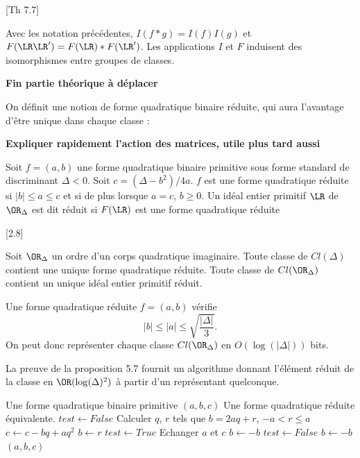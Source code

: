 \begin{Prop}\cite{Cox}[Th 7.7]
	
	Avec les notation précédentes, $I(f*g) = I(f)I(g)$ et $F(\LR\LR') = F(\LR)*F(\LR')$. Les applications $I$ et $F$ induisent des isomorphismes entre groupes de classes.
\end{Prop}




\textbf{Fin partie théorique à déplacer}




On définit une notion de forme quadratique binaire réduite, qui aura l'avantage d'être unique dans chaque classe :

\textbf{Expliquer rapidement l'action des matrices, utile plus tard aussi}

\begin{Def}
	Soit $f = (a,b)$ une forme quadratique binaire primitive sous forme standard de discriminant $\Delta < 0$. Soit $c = (\Delta - b^2)/4a$. $f$ est une forme quadratique réduite si $|b| \leq a \leq c$ et si de plus lorsque $a = c$, $b \geq 0$. Un idéal entier primitif $\LR$ de $\OR_{\Delta}$ est dit réduit si $F(\LR)$ est une forme quadratique réduite
\end{Def}

\begin{Prop}\cite{Cox}[2.8]
	
	Soit $\OR_{\Delta}$ un ordre d'un corps quadratique imaginaire. Toute classe de $Cl(\Delta)$ contient une unique forme quadratique réduite. Toute classe de $Cl(\OR_{\Delta})$ contient un unique idéal entier primitif réduit. 
\end{Prop}

\begin{Rem}
	Une forme quadratique réduite $f = (a,b)$ vérifie 
	\begin{equation*}
		|b|\leq|a|\leq\sqrt{\frac{|\Delta|}{3}}.
	\end{equation*}
	On peut donc représenter chaque classe $Cl(\OR_{\Delta})$ en $O(\log(|\Delta|))$ bits. 
\end{Rem}

La preuve de la proposition 5.7 fournit un algorithme donnant l'élément réduit de la classe en $\OR(\log(\Delta)^{2} )$ à partir d'un représentant quelconque.

\begin{algorithm}
	\caption{Réduction de forme quadratique binaire primitive}
	\begin{algorithmic}[1]
		\Require Une forme quadratique binaire primitive $(a,b,c)$
		\Ensure Une forme quadratique réduite équivalente.
		\State $test \gets False$
		\State Calculer $q$, $r$ tels que $b = 2aq + r$, $-a<r\leq a$
		\State $c \gets c - bq + aq^2$
		\State $b \gets r$
		\EndIf
		\State $test \gets True$
		\State Echanger $a$ et $c$
		\State $b \gets -b$
		\State $test \gets False$
		\EndIf
		\State $b \gets -b$
		\EndIf
		\EndIf
		\EndWhile
		\State \Return $(a,b,c)$
	\end{algorithmic}
\end{algorithm}

